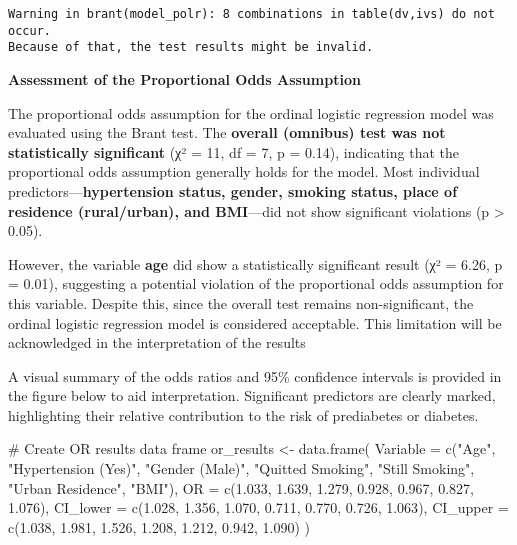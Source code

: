 \documentclass[
  letterpaper,
  DIV=11,
  numbers=noendperiod]{scrartcl}
\newenvironment{Shaded}{\begin{snugshade}}{\end{snugshade}}
\newcommand{\AttributeTok}[1]{\textcolor[rgb]{0.40,0.45,0.13}{#1}}
\newcommand{\CommentTok}[1]{\textcolor[rgb]{0.37,0.37,0.37}{#1}}
\newcommand{\FloatTok}[1]{\textcolor[rgb]{0.68,0.00,0.00}{#1}}
\newcommand{\FunctionTok}[1]{\textcolor[rgb]{0.28,0.35,0.67}{#1}}
\newcommand{\NormalTok}[1]{\textcolor[rgb]{0.00,0.23,0.31}{#1}}
\newcommand{\OtherTok}[1]{\textcolor[rgb]{0.00,0.23,0.31}{#1}}
\newcommand{\StringTok}[1]{\textcolor[rgb]{0.13,0.47,0.30}{#1}}
\begin{document}
\begin{verbatim}
Warning in brant(model_polr): 8 combinations in table(dv,ivs) do not occur.
Because of that, the test results might be invalid.
\end{verbatim}

\textbf{Assessment of the Proportional Odds Assumption}

The proportional odds assumption for the ordinal logistic regression
model was evaluated using the Brant test. The \textbf{overall (omnibus)
test was not statistically significant} (χ² = 11, df = 7, p = 0.14),
indicating that the proportional odds assumption generally holds for the
model. Most individual predictors---\textbf{hypertension status, gender,
smoking status, place of residence (rural/urban), and BMI}---did not
show significant violations (p \textgreater{} 0.05).

However, the variable \textbf{age} did show a statistically significant
result (χ² = 6.26, p = 0.01), suggesting a potential violation of the
proportional odds assumption for this variable. Despite this, since the
overall test remains non-significant, the ordinal logistic regression
model is considered acceptable. This limitation will be acknowledged in
the interpretation of the results

A visual summary of the odds ratios and 95\% confidence intervals is
provided in the figure below to aid interpretation. Significant
predictors are clearly marked, highlighting their relative contribution
to the risk of prediabetes or diabetes.

\begin{Shaded}
\begin{Highlighting}[]
\CommentTok{\# Create OR results data frame}
\NormalTok{or\_results }\OtherTok{\textless{}{-}} \FunctionTok{data.frame}\NormalTok{(}
  \AttributeTok{Variable =} \FunctionTok{c}\NormalTok{(}\StringTok{"Age"}\NormalTok{, }\StringTok{"Hypertension (Yes)"}\NormalTok{, }\StringTok{"Gender (Male)"}\NormalTok{,}
               \StringTok{"Quitted Smoking"}\NormalTok{, }\StringTok{"Still Smoking"}\NormalTok{, }\StringTok{"Urban Residence"}\NormalTok{, }\StringTok{"BMI"}\NormalTok{),}
  \AttributeTok{OR =} \FunctionTok{c}\NormalTok{(}\FloatTok{1.033}\NormalTok{, }\FloatTok{1.639}\NormalTok{, }\FloatTok{1.279}\NormalTok{, }\FloatTok{0.928}\NormalTok{, }\FloatTok{0.967}\NormalTok{, }\FloatTok{0.827}\NormalTok{, }\FloatTok{1.076}\NormalTok{),}
  \AttributeTok{CI\_lower =} \FunctionTok{c}\NormalTok{(}\FloatTok{1.028}\NormalTok{, }\FloatTok{1.356}\NormalTok{, }\FloatTok{1.070}\NormalTok{, }\FloatTok{0.711}\NormalTok{, }\FloatTok{0.770}\NormalTok{, }\FloatTok{0.726}\NormalTok{, }\FloatTok{1.063}\NormalTok{),}
  \AttributeTok{CI\_upper =} \FunctionTok{c}\NormalTok{(}\FloatTok{1.038}\NormalTok{, }\FloatTok{1.981}\NormalTok{, }\FloatTok{1.526}\NormalTok{, }\FloatTok{1.208}\NormalTok{, }\FloatTok{1.212}\NormalTok{, }\FloatTok{0.942}\NormalTok{, }\FloatTok{1.090}\NormalTok{)}
\NormalTok{)}
\end{Highlighting}
\end{Shaded}
\end{document}
